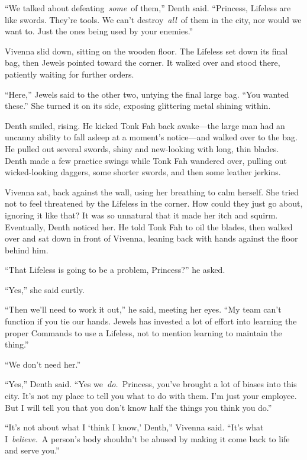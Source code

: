 “We talked about defeating~\textit{some}~of them,” Denth said. “Princess, Lifeless are like swords. They’re tools. We can’t destroy~\textit{all}~of them in the city, nor would we want to. Just the ones being used by your enemies.”

Vivenna slid down, sitting on the wooden floor. The Lifeless set down its final bag, then Jewels pointed toward the corner. It walked over and stood there, patiently waiting for further orders.

“Here,” Jewels said to the other two, untying the final large bag. “You wanted these.” She turned it on its side, exposing glittering metal shining within.

Denth smiled, rising. He kicked Tonk Fah back awake—the large man had an uncanny ability to fall asleep at a moment’s notice—and walked over to the bag. He pulled out several swords, shiny and new-looking with long, thin blades. Denth made a few practice swings while Tonk Fah wandered over, pulling out wicked-looking daggers, some shorter swords, and then some leather jerkins.

Vivenna sat, back against the wall, using her breathing to calm herself. She tried not to feel threatened by the Lifeless in the corner. How could they just go about, ignoring it like that? It was so unnatural that it made her itch and squirm. Eventually, Denth noticed her. He told Tonk Fah to oil the blades, then walked over and sat down in front of Vivenna, leaning back with hands against the floor behind him.

“That Lifeless is going to be a problem, Princess?” he asked.

“Yes,” she said curtly.

“Then we’ll need to work it out,” he said, meeting her eyes. “My team can’t function if you tie our hands. Jewels has invested a lot of effort into learning the proper Commands to use a Lifeless, not to mention learning to maintain the thing.”

“We don’t need her.”

“Yes,” Denth said. “Yes we~\textit{do.}~Princess, you’ve brought a lot of biases into this city. It’s not my place to tell you what to do with them. I’m just your employee. But I will tell you that you don’t know half the things you think you do.”

“It’s not about what I ‘think I know,’ Denth,” Vivenna said. “It’s what I~\textit{believe.}~A person’s body shouldn’t be abused by making it come back to life and serve you.”

